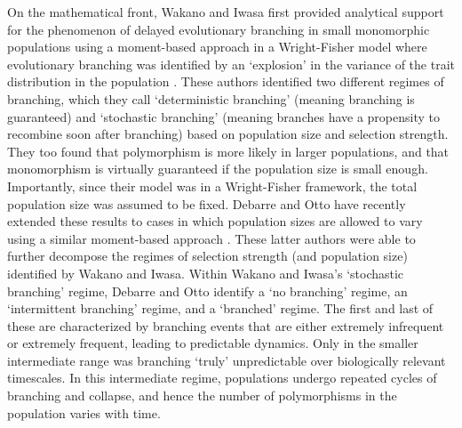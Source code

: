 
On the mathematical front, Wakano and Iwasa first provided analytical support for the phenomenon of delayed evolutionary branching in small monomorphic populations using a moment-based approach in a Wright-Fisher model where evolutionary branching was identified by an `explosion' in the variance of the trait distribution in the population \citep{wakano_evolutionary_2013}. These authors identified two different regimes of branching, which they call `deterministic branching' (meaning branching is guaranteed) and `stochastic branching' (meaning branches have a propensity to recombine soon after branching) based on population size and selection strength. They too found that polymorphism is more likely in larger populations, and that monomorphism is virtually guaranteed if the population size is small enough. Importantly, since their model was in a Wright-Fisher framework, the total population size was assumed to be fixed. Debarre and Otto have recently extended these results to cases in which population sizes are allowed to vary using a similar moment-based approach  \citep{debarre_evolutionary_2016}. These latter authors were able to further decompose the regimes of selection strength (and population size) identified by Wakano and Iwasa. Within Wakano and Iwasa's `stochastic branching' regime, Debarre and Otto identify a `no branching' regime, an `intermittent branching' regime, and a `branched' regime. The first and last of these are characterized by branching events that are either extremely infrequent or extremely frequent, leading to predictable dynamics. Only in the smaller intermediate range was branching `truly' unpredictable over biologically relevant timescales. In this intermediate regime, populations undergo repeated cycles of branching and collapse, and hence the number of polymorphisms in the population varies with time.\\

